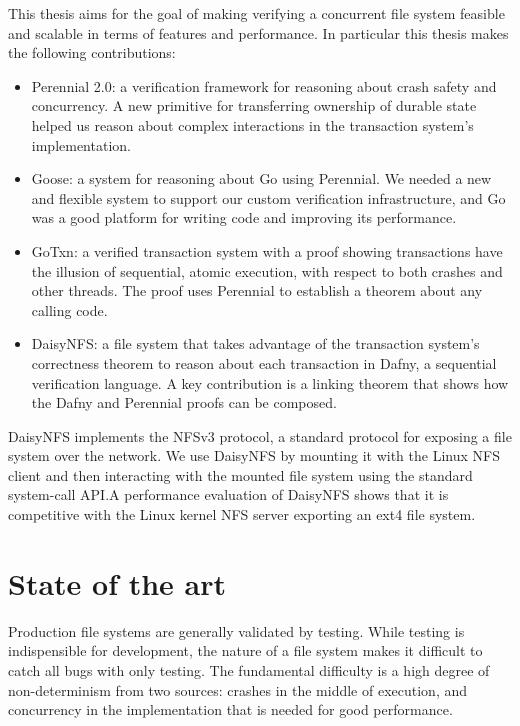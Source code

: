 This thesis aims for the goal of making verifying a concurrent file system
feasible and scalable in terms of features and performance. In particular this thesis
makes the following contributions:
\begin{itemize}
  \item Perennial 2.0: a verification framework for reasoning about crash
  safety and concurrency. A new primitive for transferring ownership of durable
  state helped us reason about complex interactions in the transaction system's
  implementation.
  \item Goose: a system for reasoning about Go using Perennial. We needed a
  new and flexible system to support our custom verification infrastructure, and
  Go was a good platform for writing code and improving its performance.
  \item GoTxn: a verified transaction system with a proof showing transactions have the
    illusion of sequential, atomic execution, with respect to both crashes and other
    threads. The proof uses Perennial to establish a theorem about any calling code.
  \item DaisyNFS: a file system that takes advantage of the transaction system's
    correctness theorem to reason about each transaction in Dafny, a
    sequential verification language. A key contribution is a linking theorem
    that shows how the Dafny and Perennial proofs can be composed.
\end{itemize}

DaisyNFS implements the NFSv3 protocol, a standard protocol for exposing
a file system over the network. We use DaisyNFS by mounting it with the
Linux NFS client and then interacting with the mounted file system using
the standard system-call API.\@ A performance evaluation of DaisyNFS shows
that it is competitive with the Linux kernel NFS server exporting an
ext4 file system.

\section{State of the art}

Production file systems are generally validated by testing. While testing is
indispensible for development, the nature of a file system makes it difficult to
catch all bugs with only testing. The fundamental difficulty is a high degree of
non-determinism from two sources: crashes in the middle of execution, and
concurrency in the implementation that is needed for good performance.

